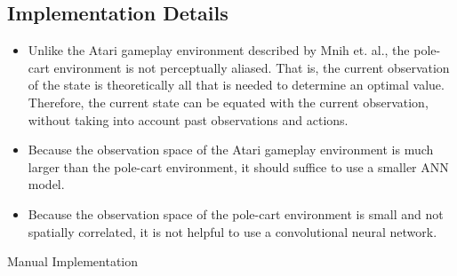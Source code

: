 \documentclass[a4paper]{article}
\begin{document}
\subsection*{Implementation Details}
\begin{itemize}
    \item Unlike the Atari gameplay environment described by Mnih et. al., the
        pole-cart environment is not perceptually aliased. That is, the current
        observation of the state is theoretically all that is needed to
        determine an optimal value. Therefore, the current state can be equated
        with the current observation, without taking into account past
        observations and actions.
    \item Because the observation space of the Atari gameplay environment is
        much larger than the pole-cart environment, it should suffice to use a
        smaller ANN model.
    \item Because the observation space of the pole-cart environment is small
        and not spatially correlated, it is not helpful to use a convolutional
        neural network.
\end{itemize}
Manual Implementation
\end{document}
